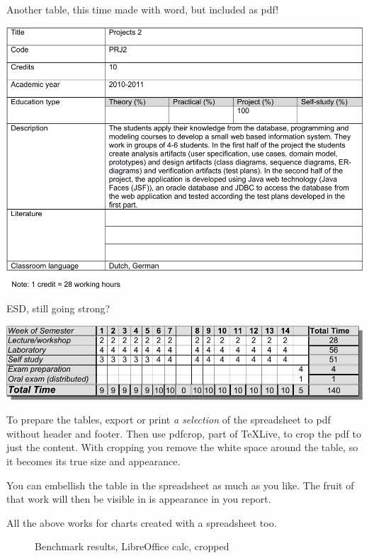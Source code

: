\begin{table}
  \caption{Another table, this time made with word, but included as pdf!}
\includegraphics{tables/md_prj2-crop.pdf}   
\end{table}

\begin{table}
  \caption{ESD, still going strong?}
\includegraphics{tables/timetable-crop.pdf}
\end{table}


To prepare the tables, export or print \textit{a selection} of the spreadsheet to pdf without header and footer.
Then use pdfcrop, part of TeXLive, to crop the pdf to just the content. With cropping you remove the white space around the table, so it becomes its true size and appearance.

You can embellish the table in the spreadsheet as much as you like. The fruit of that work will then be visible in is appearance in you report.

All the above works for charts created with a spreadsheet too.

\begin{figure}
  \centering
{}
  \caption{Benchmark results, LibreOffice calc, cropped}
\end{figure}


